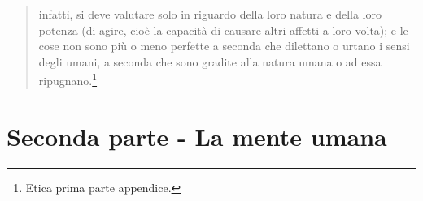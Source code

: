 \begin{quotation}
	infatti, si deve valutare solo in riguardo della loro natura e della loro potenza (di agire, cioè la capacità  di causare altri affetti a loro volta); e le cose non
	sono più o meno perfette a seconda che dilettano o urtano i sensi degli umani, a seconda
	che sono gradite alla natura umana o ad essa ripugnano.\footnote{Etica prima parte appendice.}
	
\end{quotation}
\newpage
\section{Seconda parte - La mente umana}

